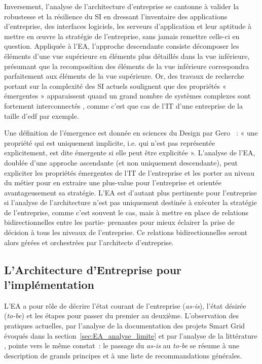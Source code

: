Inversement, l'analyse de l'architecture d'entreprise se cantonne à valider
la robustesse et la résilience du SI en dressant l'inventaire des applications
d'entreprise, des interfaces logiciels, les serveurs d'application et leur
aptitude à mettre en œuvre la stratégie de l'entreprise, sans jamais remettre
celle-ci en question. Appliquée à l'EA, l'approche descendante consiste
décomposer les éléments d'une vue supérieure en éléments plus détaillés dans la
vue inférieure, présumant que la recomposition des éléments de la vue
inférieure correspondra parfaitement aux éléments de la vue supérieure. Or, des
travaux de recherche portant sur la complexité des SI actuels soulignent que
des propriétés « émergentes » apparaissent quand un grand nombre de systèmes
complexes sont fortement interconnectés \cite{bullock2004complexity}, comme
c'est que cas de l'IT d'une entreprise de la taille d'\gls{edf} par exemple.

 Une définition de l'émergence est donnée en sciences du Design par Gero
\cite{gero1992creativity}~: « une propriété qui est uniquement implicite, i.e.
qui n'est pas représentée explicitement, est dite émergente si elle peut être
explicitée ». L'analyse de l'EA, doublée d'une approche ascendante (et non
uniquement descendante), peut expliciter les propriétés émergentes de l'IT de
l'entreprise et les porter au niveau du métier pour en extraire une plus-value
pour l'entreprise et orientée avantageusement sa stratégie. L'EA est d'autant
plus pertinente pour l'entreprise si l'analyse de l'architecture n'est pas
uniquement destinée à exécuter la stratégie de l'entreprise, comme c'est souvent
le cas, mais à mettre en place de relations bidirectionnelles entre les partie-
prenantes pour mieux éclairer la prise de décision à tous les niveaux de
l'entreprise. Ce relations bidirectionnelles seront alors gérées et orchestrées
par l'architecte d'entreprise.


	\subsection{L'Architecture d'Entreprise pour l'implémentation}

 L'EA a pour rôle de décrire l'état courant de l'entreprise (\textit{as-is}),
l'état désirée (\textit{to-be}) et les étapes pour passer du premier au
deuxième. L'observation des pratiques actuelles, par l'analyse de la
documentation des projets Smart Grid évoqués dans la
section~\ref{sec:EA_analyse_limite} et par l'analyse de la littérature , pointe
vers le même constat~: le passage du \textit{as-is} au \textit{to-be} se résume
à une description de grands principes et à une liste de recommandations
générales.

